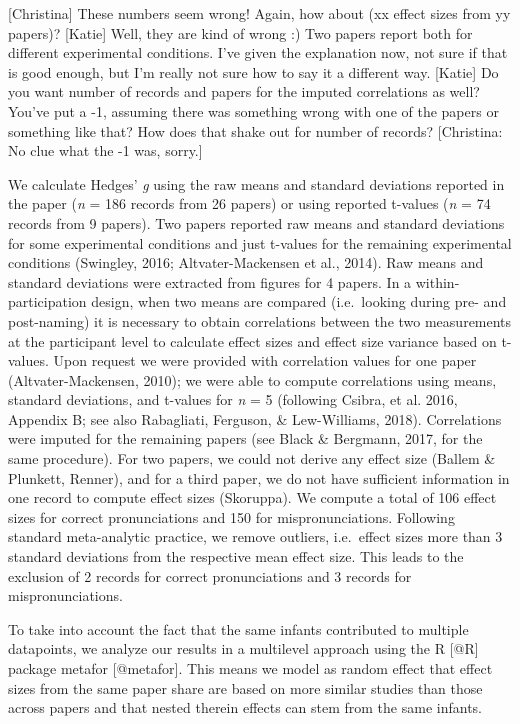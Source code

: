 \documentclass[man]{apa6}
\theoremstyle{definition}
\theoremstyle{definition}
\theoremstyle{definition}
\theoremstyle{remark}
\begin{document}
{[}Christina{]} These numbers seem wrong! Again, how about (xx effect
sizes from yy papers)? {[}Katie{]} Well, they are kind of wrong :) Two
papers report both for different experimental conditions. I've given the
explanation now, not sure if that is good enough, but I'm really not
sure how to say it a different way. {[}Katie{]} Do you want number of
records and papers for the imputed correlations as well? You've put a
-1, assuming there was something wrong with one of the papers or
something like that? How does that shake out for number of records?
{[}Christina: No clue what the -1 was, sorry.{]}

We calculate Hedges' \emph{g} using the raw means and standard
deviations reported in the paper (\emph{n} = 186 records from 26 papers)
or using reported t-values (\emph{n} = 74 records from 9 papers). Two
papers reported raw means and standard deviations for some experimental
conditions and just t-values for the remaining experimental conditions
(Swingley, 2016; Altvater-Mackensen et al., 2014). Raw means and
standard deviations were extracted from figures for 4 papers. In a
within-participation design, when two means are compared (i.e.~looking
during pre- and post-naming) it is necessary to obtain correlations
between the two measurements at the participant level to calculate
effect sizes and effect size variance based on t-values. Upon request we
were provided with correlation values for one paper (Altvater-Mackensen,
2010); we were able to compute correlations using means, standard
deviations, and t-values for \emph{n} = 5 (following Csibra, et al.
2016, Appendix B; see also Rabagliati, Ferguson, \& Lew-Williams, 2018).
Correlations were imputed for the remaining papers (see Black \&
Bergmann, 2017, for the same procedure). For two papers, we could not
derive any effect size (Ballem \& Plunkett, Renner), and for a third
paper, we do not have sufficient information in one record to compute
effect sizes (Skoruppa). We compute a total of 106 effect sizes for
correct pronunciations and 150 for mispronunciations. Following standard
meta-analytic practice, we remove outliers, i.e.~effect sizes more than
3 standard deviations from the respective mean effect size. This leads
to the exclusion of 2 records for correct pronunciations and 3 records
for mispronunciations.

To take into account the fact that the same infants contributed to
multiple datapoints, we analyze our results in a multilevel approach
using the R {[}@R{]} package metafor {[}@metafor{]}. This means we model
as random effect that effect sizes from the same paper share are based
on more similar studies than those across papers and that nested therein
effects can stem from the same infants.
\end{document}
